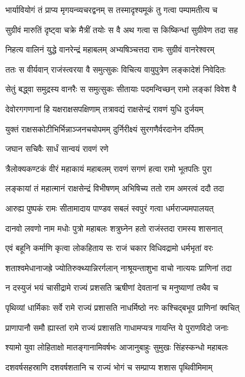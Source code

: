 \twolineshloka
{भार्यावियोगं तं प्राप्य मृगयन्व्यचरद्वनम्}
{स तस्मादृश्यमूकं तु गत्वा पम्पामतीत्य च}


\twolineshloka
{सुग्रीवं मारुतिं दृष्ट्वा चक्रे मैत्रीं तयोः स वै}
{अथ गत्वा स किष्किन्धां सुग्रीवेण तदा सह}


\twolineshloka
{निहत्य वालिनं युद्धे वानरेन्द्रं महाबलम्}
{अभ्यषिञ्चत्तदा रामः सुग्रीवं वानरेश्वरम्}


\twolineshloka
{ततः स वीर्यवान् राजंस्त्वरया वै समुत्सुकः}
{विचित्य वायुपुत्रेण लङ्कादेशं निवेदितः}


\twolineshloka
{सेतुं बद्ध्वा समुद्रस्य वानरैः स समुत्सुकः}
{सीतायाः पदमन्विच्छन् रामो लङ्कां विवेश वै}


\twolineshloka
{देवोरगगणानां हि यक्षराक्षसपक्षिणाम्}
{तत्रावद्यं राक्षसेन्द्रं रावणं युधि दुर्जयम्}


\twolineshloka
{युक्तं राक्षसकोटीभिर्भिन्नाञ्जनचयोपमम्}
{दुर्निरीक्ष्यं सुरगणैर्वरदानेन दर्पितम्}


\onelineshloka
{जघान सचिवैः सार्धं सान्वयं रावणं रणे}


\twolineshloka
{त्रैलोक्यकण्टकं वीरं महाकायं महाबलम्}
{रावणं सगणं हत्वा रामो भूतपतिः पुरा}


\twolineshloka
{लङ्कायां तं महात्मानं राक्षसेन्द्रं विभीषणम्}
{अभिषिच्य ततो राम अमरत्वं ददौ तदा}


\twolineshloka
{आरुह्य पुष्पकं रामः सीतामादाय पाण्डव}
{सबलं स्वपुरं गत्वा धर्मराज्यमपालयत्}


\twolineshloka
{दानवो लवणो नाम मधोः पुत्रो महाबलः}
{शत्रुघ्नेन हतो राजंस्तदा रामस्य शासनात्}


\twolineshloka
{एवं बहूनि कर्माणि कृत्वा लोकहिताय सः}
{राजं चकार विधिवद्रामो धर्मभृतां वरः}


\twolineshloka
{शताश्वमेधानाजह्रे ज्योतिरुक्थ्यान्निरर्गलान्}
{नाश्रूयन्ताशुभा वाचो नात्ययः प्राणिनां तदा}


\twolineshloka
{न दस्युजं भयं चासीद्रामे राज्यं प्रशसति}
{ऋषीणां देवतानां च मनुष्याणां तथैव च}


\twolineshloka
{पृथिव्यां धार्मिकाः सर्वे रामे राज्यं प्रशासति}
{नाधर्मिष्ठो नरः कश्चिद्बभूव प्राणिनां क्वचित्}


\twolineshloka
{प्राणापानौ समौ ह्यास्तां रामे राज्यं प्रशासति}
{गाधामप्यत्र गायन्ति ये पुराणविदो जनाः}


\twolineshloka
{श्यामो युवा लोहिताक्षो मातङ्गानामिवर्षभः}
{आजानुबाहुः सुमुखः सिंहस्कन्धो महाबलः}


\twolineshloka
{दशवर्षसहस्राणि दशवर्षशतानि च}
{राज्यं भोगं च सम्प्राप्य शशास पृथिवीमिमाम्}


